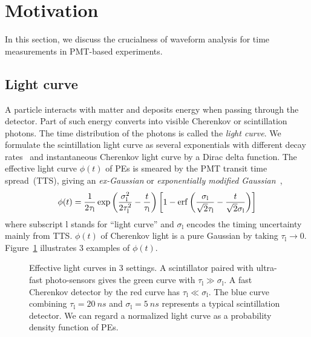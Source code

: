 \section{Motivation}
\label{sec:toyMC}

In this section, we discuss the crucialness of waveform analysis for time measurements in PMT-based experiments.

\subsection{Light curve}
A particle interacts with matter and deposits energy when passing through the detector. Part of such energy converts into visible Cherenkov or scintillation photons. The time distribution of the photons is called the \textit{light curve}.  We formulate the scintillation light curve as several exponentials with different decay rates~\cite{rebber_particle_2021} and instantaneous Cherenkov light curve by a Dirac delta function.  The effective light curve $\phi(t)$ of PEs is smeared by the PMT transit time spread~(TTS), giving an \textit{ex-Gaussian} or \textit{exponentially modified Gaussian}~\cite{li_separation_2016},
\begin{align}
    \phi(t) = \frac{1}{2\tau_\mathrm{l}} \exp\left(\frac{\sigma_\mathrm{l}^2}{2\tau_\mathrm{l}^2}-\frac{t}{\tau_\mathrm{l}}\right) \left[1 - \operatorname{erf}\left( \frac{\sigma_\mathrm{l}}{\sqrt{2}\tau_\mathrm{l}} - \frac{t}{\sqrt{2}\sigma_\mathrm{l}} \right)\right]
    \label{eq:time-pro}
\end{align}
where subscript $\mathrm{l}$ stands for ``light curve'' and $\sigma_\mathrm{l}$ encodes the timing uncertainty mainly from TTS. $\phi(t)$ of Cherenkov light is a pure Gaussian by taking $\tau_\mathrm{l} \rightarrow 0$. Figure~\ref{fig:time-pro} illustrates 3 examples of $\phi(t)$. 

\begin{figure}[!htb]
  \centering
  \resizebox{0.5\textwidth}{!}{}
  \caption{\label{fig:time-pro} Effective light curves in 3 settings.  A scintillator paired with ultra-fast photo-sensors gives the green curve with $\tau_\mathrm{l} \gg \sigma_\mathrm{l}$.  A fast Cherenkov detector by the red curve has $\tau_\mathrm{l} \ll \sigma_\mathrm{l}$.  The blue curve combining $\tau_\mathrm{l}=\SI{20}{ns}$ and $\sigma_\mathrm{l}=\SI{5}{ns}$ represents a typical scintillation detector.  We can regard a normalized light curve as a probability density function of PEs.}
\end{figure}


